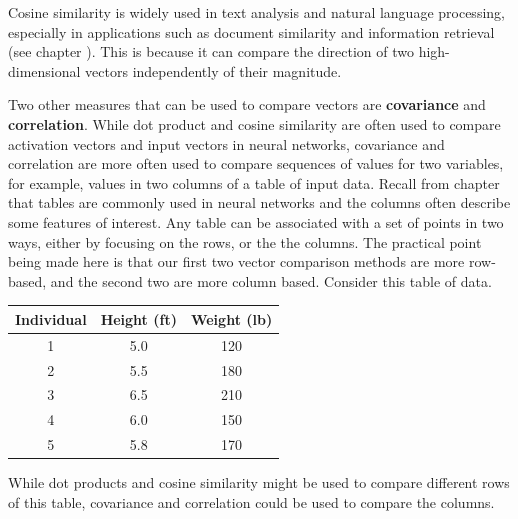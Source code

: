    Cosine similarity is widely used in text analysis and natural language 
processing, especially in applications such as document similarity and 
information retrieval (see chapter ). This is 
because it can compare the direction of two high-dimensional vectors independently
of their magnitude.  

   Two other measures that can be used to compare vectors are \textbf{covariance} and \textbf{correlation}. While dot product and cosine similarity are often used to compare activation vectors and input vectors in neural networks, covariance and correlation are more often used to compare sequences of values for two variables, for example, values in two columns of a table of input data.  Recall from chapter  that tables 
are commonly used in neural networks and the columns often describe some
features of interest.  Any table can be associated with a set of points in two ways, either by focusing on the rows, or the the columns. The practical point being made here is that our first two vector comparison methods are more row-based, and the second two are more column based. Consider this table of data.
\begin{center}
\begin{tabular}{ccc}
\textbf{Individual} & \textbf{Height (ft)} & \textbf{Weight (lb)} \\
\hline
1 & 5.0 & 120 \\
2 & 5.5 & 180 \\
3 & 6.5 & 210 \\
4 & 6.0 & 150 \\
5 & 5.8 & 170 \\
\end{tabular}
\end{center}
While dot products and cosine similarity might be used to compare different rows of this table, covariance and correlation could be used to compare the columns.
   
